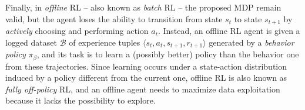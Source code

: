 Finally, in \textit{offline} RL -- also known as \textit{batch} RL --
the proposed MDP remain valid, but the agent loses the ability to transition
from state $s_t$ to state $s_{t+1}$ by \textit{actively} choosing and
performing action $a_t$. Instead, an offline RL agent is given a
logged dataset $\mathcal{B}$ of experience tuples
$\langle s_t,a_t,s_{t+1},r_{t+1}\rangle$ generated by a \textit{behavior
policy} $\pi_{\beta}$, and its task is to learn a (possibly better)
policy than the behavior one from these trajectories.
Since learning occurs under a state-action distribution induced by a
policy different from the current one, offline RL is also
known as \textit{fully off-policy} RL, and an offline agent needs to
maximize data exploitation because it lacks the possibility to
explore.